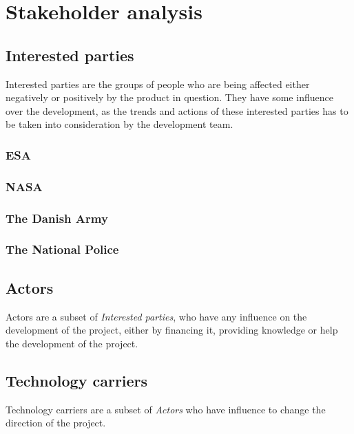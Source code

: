 \section{Stakeholder analysis}
	
\subsection{Interested parties}
Interested parties are the groups of people who are being affected either negatively or positively by the product in question. They have some influence over the development, as the trends and actions of these interested parties has to be taken into consideration by the development team.

\subsubsection{ESA}

\subsubsection{NASA}

\subsubsection{The Danish Army}

\subsubsection{The National Police}

\subsection{Actors}
Actors are a subset of \textit{Interested parties}, who have any influence on the development of the project, either by financing it, providing knowledge or help the development of the project.
	
\subsection{Technology carriers}
Technology carriers are a subset of \textit{Actors} who have influence to change the direction of the project.

